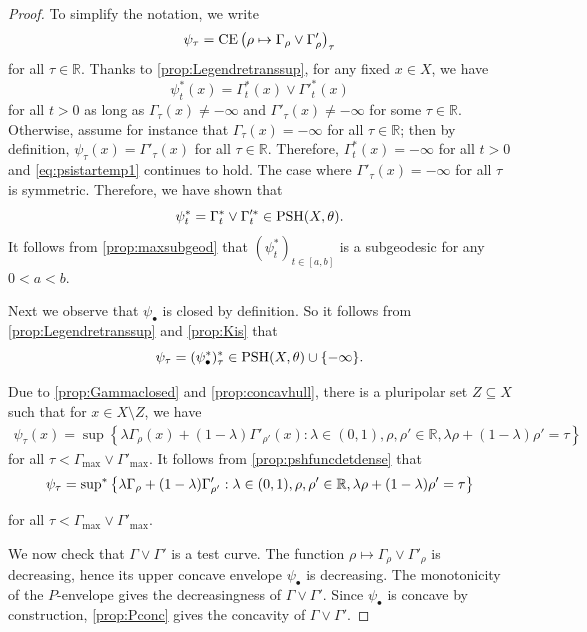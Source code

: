 \begin{proof}
    To simplify the notation, we write
    \[
    \psi_{\tau}=\operatorname{CE}\left( \rho \mapsto \Gamma_{\rho}\lor \Gamma'_{\rho} \right)_{\tau}
    \]
    for all $\tau\in \mathbb{R}$. Thanks to \cref{prop:Legendretranssup}, for any fixed $x\in X$, we have
    \begin{equation}\label{eq:psistartemp1}
    \psi^*_t(x)=\Gamma^*_t(x)\lor \Gamma'^*_t(x)
    \end{equation}
    for all $t>0$ as long as $\Gamma_{\tau}(x)\neq -\infty$ and $\Gamma'_{\tau}(x)\neq -\infty$ for some $\tau\in \mathbb{R}$. Otherwise, assume for instance that $\Gamma_{\tau}(x)=-\infty$ for all $\tau\in \mathbb{R}$; then by definition, $\psi_{\tau}(x)=\Gamma'_{\tau}(x)$ for all $\tau\in \mathbb{R}$. Therefore, $\Gamma^*_t(x)=-\infty$ for all $t>0$ and \eqref{eq:psistartemp1} continues to hold. The case where $\Gamma'_{\tau}(x)=-\infty$ for all $\tau$ is symmetric. Therefore, we have shown that
    \[
    \psi^*_t=\Gamma^*_t\lor \Gamma'^*_t\in \mathrm{PSH}(X,\theta).
    \]
    It follows from \cref{prop:maxsubgeod} that $(\psi^*_t)_{t\in [a,b]}$ is a subgeodesic for any $0< a<b$.

    Next we observe that $\psi_{\bullet}$ is closed by definition. So it follows from \cref{prop:Legendretranssup} and \cref{prop:Kis} that
    \[
    \psi_{\tau}=(\psi^*_{\bullet})^*_{\tau}\in \mathrm{PSH}(X,\theta)\cup \{-\infty\}.
    \]

    Due to \cref{prop:Gammaclosed} and \cref{prop:concavhull}, there is a pluripolar set $Z\subseteq X$ such that for $x\in X\setminus Z$, we have
    \[
    \begin{split}
    \psi_{\tau}(x)=\sup\left\{\lambda \Gamma_{\rho}(x)+(1-\lambda)\Gamma'_{\rho'}(x): \lambda \in (0,1),\rho,\rho'\in \mathbb{R},\lambda\rho+(1-\lambda)\rho'=\tau\right\}
    \end{split}
    \]
    for all $\tau<\Gamma_{\max}\lor \Gamma'_{\max}$. It follows from \cref{prop:pshfuncdetdense} that
    \begin{equation}\label{eq:psitausupslineartemp}
    \begin{split}
    \psi_{\tau}=\operatorname*{sup}_{}{}\!{}^{*} \left\{\lambda \Gamma_{\rho}+(1-\lambda)\Gamma'_{\rho'}: \lambda \in (0,1),\rho,\rho'\in \mathbb{R},\lambda\rho+(1-\lambda)\rho'=\tau \right\}
    \end{split}
    \end{equation}
    for all $\tau<\Gamma_{\max}\lor \Gamma'_{\max}$.

    We now check that $\Gamma\lor\Gamma'$ is a test curve. The function $\rho\mapsto\Gamma_\rho\lor\Gamma'_\rho$ is decreasing, hence its upper concave envelope $\psi_\bullet$ is decreasing. The monotonicity of the $P$-envelope  gives the decreasingness of $\Gamma\lor\Gamma'$. Since $\psi_\bullet$ is concave by construction, \cref{prop:Pconc} gives the concavity of $\Gamma\lor\Gamma'$.


\end{proof}
